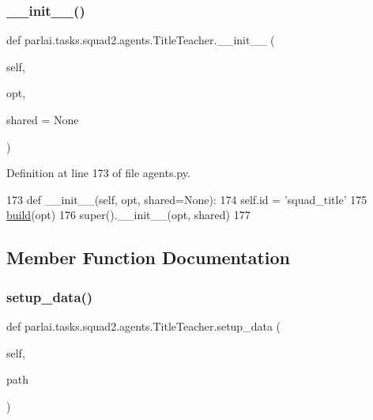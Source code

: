 \subsubsection{\texorpdfstring{\+\_\+\+\_\+init\+\_\+\+\_\+()}{\_\_init\_\_()}}
{\footnotesize\ttfamily def parlai.\+tasks.\+squad2.\+agents.\+Title\+Teacher.\+\_\+\+\_\+init\+\_\+\+\_\+ (\begin{DoxyParamCaption}\item[{}]{self,  }\item[{}]{opt,  }\item[{}]{shared = {\ttfamily None} }\end{DoxyParamCaption})}



Definition at line 173 of file agents.\+py.


\begin{DoxyCode}
173     \textcolor{keyword}{def }\_\_init\_\_(self, opt, shared=None):
174         self.id = \textcolor{stringliteral}{'squad\_title'}
175         \hyperlink{namespaceparlai_1_1mturk_1_1tasks_1_1talkthewalk_1_1download_a8c0fbb9b6dfe127cb8c1bd6e7c4e33fd}{build}(opt)
176         super().\_\_init\_\_(opt, shared)
177 
\end{DoxyCode}


\subsection{Member Function Documentation}
\mbox{\label{classparlai_1_1tasks_1_1squad2_1_1agents_1_1TitleTeacher_aef7bf6b95b4e6d87052ee193145db9f1}} 
\subsubsection{\texorpdfstring{setup\+\_\+data()}{setup\_data()}}
{\footnotesize\ttfamily def parlai.\+tasks.\+squad2.\+agents.\+Title\+Teacher.\+setup\+\_\+data (\begin{DoxyParamCaption}\item[{}]{self,  }\item[{}]{path }\end{DoxyParamCaption})}



